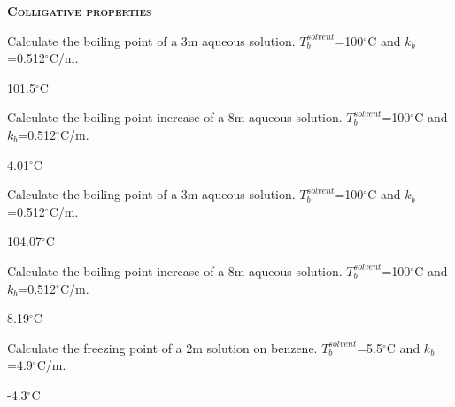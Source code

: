 \documentclass[main.tex]{subfiles}
\begin{document}
\begin{multicols*}{2}
{\raggedright\textsc{\textbf{Colligative properties }}\par}

\begin{question}[ID=\the\value{numA}]
Calculate the boiling point of a 3m  aqueous solution. $T^{solvent}_b$=100$^{\circ}$C and $k_b$=0.512$^{\circ}$C/m.
\end{question}
\begin{solution}
101.5$^{\circ}$C
\hspace{0.1cm}\end{solution}%

\begin{question}[ID=\the\value{numA}]
Calculate the boiling point increase of a 8m  aqueous solution. $T^{solvent}_b$=100$^{\circ}$C and $k_b$=0.512$^{\circ}$C/m.
\end{question}
\begin{solution}
4.01$^{\circ}$C
\hspace{0.1cm}\end{solution}%

\begin{question}[ID=\the\value{numA}]
Calculate the boiling point of a 3m  aqueous solution. $T^{solvent}_b$=100$^{\circ}$C and $k_b$=0.512$^{\circ}$C/m.
\end{question}
\begin{solution}
104.07$^{\circ}$C
\hspace{0.1cm}\end{solution}%

\begin{question}[ID=\the\value{numA}]
Calculate the boiling point increase of a 8m  aqueous solution. $T^{solvent}_b$=100$^{\circ}$C and $k_b$=0.512$^{\circ}$C/m.
\end{question}
\begin{solution}
8.19$^{\circ}$C
\hspace{0.1cm}\end{solution}%


\begin{question}[ID=\the\value{numA}]
Calculate the freezing point of a 2m  solution on benzene. $T^{solvent}_b$=5.5$^{\circ}$C and $k_b$=4.9$^{\circ}$C/m.
\end{question}
\begin{solution}
-4.3$^{\circ}$C
\hspace{0.1cm}\end{solution}%



\end{multicols*}
\end{document}
